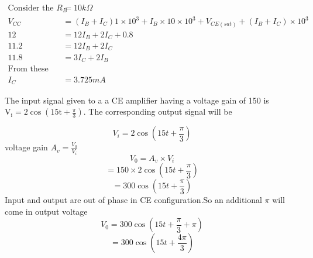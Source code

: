 \begin{enumerate}
\begin{answer}
\begin{align*}
\text{Consider the loop containing base resisitor} R_B&=10k\Omega\\
V_{CC}&=(I_B+I_C)1\times 10^3+I_B\times 10\times 10^3+V_{CE(sat)}+(I_B+I_C)\times 10^3\\
12&=12I_B+2I_C+0.8\\
11.2&=12I_B+2I_C\\
11.8&=3I_C+2I_B\\
\text{From these two equations we will get }\\
I_C&=3.725mA
\end{align*}	
\end{answer}
	\begin{minipage}{\textwidth}
	\item The input signal given to a a CE amplifier having a voltage gain of 150 is $\mathrm{V}_{\mathrm{i}}=2 \cos \left(15 \mathrm{t}+\frac{\pi}{3}\right)$. The corresponding output signal will be
\end{minipage}
\begin{answer}
$$V_i=2\cos(15t+\frac{\pi}{3})$$
voltage gain $A_v=\frac{V_0}{V_i}$
$$V_0=A_v\times V_i$$
$$=150\times 2 \cos (15t+\frac{\pi}{3})	$$
$$=300\cos (15t+\frac{\pi}{3})$$
Input and output are out of phase in CE configuration.So an additional $\pi$ will come in output voltage\\
$$V_0=300\cos (15t+\frac{\pi}{3}+\pi)$$
$$=300\cos(15t+\frac{4\pi}{3})$$
\end{answer}	
\end{enumerate}
\newpage
